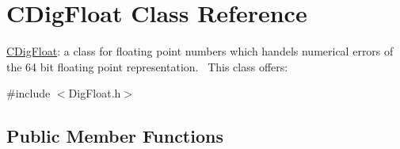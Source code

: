 \hypertarget{classCDigFloat}{}\section{C\+Dig\+Float Class Reference}
\label{classCDigFloat}


\hyperlink{classCDigFloat}{C\+Dig\+Float}\+: a class for floating point numbers which handels numerical errors of the 64 bit floating point representation.~\newline
 This class offers\+:  




{\ttfamily \#include $<$Dig\+Float.\+h$>$}

\subsection*{Public Member Functions}
